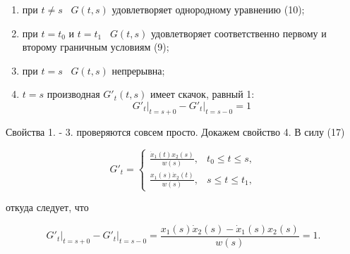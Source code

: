 \documentclass{article}
\theoremstyle{plain} \newtheorem*{theorem*}{Теорема}
\theoremstyle{plain} \newtheorem{theorem}{Теорема}[section]
\theoremstyle{defintition} \newtheorem*{corollary*}{Следствие}
\theoremstyle{remark} \newtheorem*{example*}{Пример}
\theoremstyle{remark} \newtheorem*{remark*}{Замечание}
\begin{document}
\begin{enumerate}
    \item при $t \ne s$ \ $G(t,s)$ удовлетворяет однородному
        уравнению (10);
    \item при $t = t_0$ и $t = t_1$ \ $G(t,s)$ удовлетворяет
        соответственно первому и второму граничным условиям (9);
    \item при $t = s$ \ $G(t,s)$ непрерывна;
    \item $t = s$ производная $G'_t(t,s)$ имеет скачок, равный 1:
        \begin{equation*}
            G'_t \vert_{t = s + 0} - G'_t \vert_{t = s - 0} = 1
        \end{equation*}
\end{enumerate}

Свойства 1. - 3. проверяются совсем просто. Докажем свойство 4.
В силу (17)

\begin{equation*}
    G'_t =
    \begin{cases}
        \frac{\dot{x}_1(t) x_2(s)}{w(s)}, &t_0 \le t \le s, \\
        \frac{x_1(s) \dot{x}_2(t)}{w(s)}, &s \le t \le t_1,
    \end{cases}
\end{equation*}

откуда следует, что

\begin{equation*}
    G'_t \vert_{t = s + 0} - G'_t \vert_{t = s - 0} =
    \frac{x_1(s) \dot{x}_2(s) - \dot{x}_1(s) x_2(s)}{w(s)} = 1.
\end{equation*}
\end{document}
